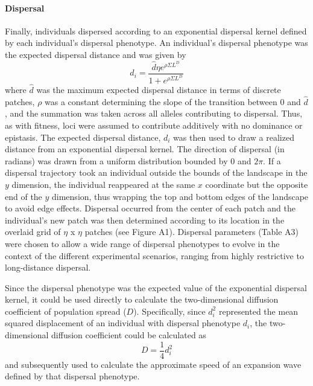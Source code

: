 \documentclass[11pt]{article}
\begin{document}
\paragraph{Dispersal}
Finally, individuals dispersed according to an exponential dispersal kernel defined by each individual's dispersal phenotype. An individual's dispersal phenotype was the expected dispersal distance and was given by
\begin{equation}
d_{i} = \frac{\hat{d}\eta e^{\rho\Sigma L^{D}}}{1+e^{\rho\Sigma L^{D}}} 
\end{equation}
where $\hat{d}$ was the maximum expected dispersal distance in terms of discrete patches, $\rho$ was a constant determining the slope of the transition between $0$ and $\hat{d}$, and the summation was taken across all alleles contributing to dispersal. Thus, as with fitness, loci were assumed to contribute additively with no dominance or epistasis. The expected dispersal distance, $d_{i}$ was then used to draw a realized distance from an exponential dispersal kernel. The direction of dispersal (in radians) was drawn from a uniform distribution bounded by $0$ and $2\pi$. If a dispersal trajectory took an individual outside the bounds of the landscape in the $y$ dimension, the individual reappeared at the same $x$ coordinate but the opposite end of the $y$ dimension, thus wrapping the top and bottom edges of the landscape to avoid edge effects. Dispersal occurred from the center of each patch and the individual's new patch was then determined according to its location in the overlaid grid of $\eta$ x $\eta$ patches (see Figure A1). Dispersal parameters (Table A3) were chosen to allow a wide range of dispersal phenotypes to evolve in the context of the different experimental scenarios, ranging from highly restrictive to long-distance dispersal.

Since the dispersal phenotype was the expected value of the exponential dispersal kernel, it could be used directly to calculate the two-dimensional diffusion coefficient of population spread ($D$). Specifically, since $d_{i}^{2}$ represented the mean squared displacement of an individual with dispersal phenotype $d_{i}$, the two-dimensional diffusion coefficient could be calculated as
\begin{equation}
D = \frac{1}{4}d_{i}^{2}
\end{equation}
and subsequently used to calculate the approximate speed of an expansion wave defined by that dispersal phenotype.

\newpage{}
\end{document}
